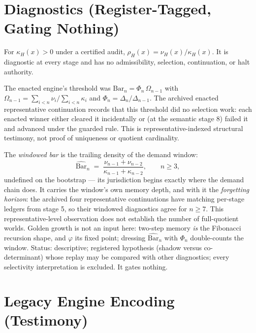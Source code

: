 \section{Diagnostics (Register-Tagged, Gating Nothing)}
\label{def:diagnostics}

\begin{definition}
For \(\kappa_H(x)>0\) under a certified audit,
\(\rho_H(x)=\nu_H(x)/\kappa_H(x)\). It is diagnostic at every stage and has no
admissibility, selection, continuation, or halt authority.
\end{definition}

\begin{definition}
The enacted engine's threshold was
\(\mathrm{Bar}_n=\Phi_n\,\Omega_{n-1}\) with
\(\Omega_{n-1}=\sum_{i<n}\nu_i/\sum_{i<n}\kappa_i\) and
\(\Phi_n=\Delta_n/\Delta_{n-1}\). The archived enacted representative
continuation records that this threshold did no selection work: each enacted
winner either cleared it incidentally or (at the semantic stage 8) failed it
and advanced under the guarded rule. This is representative-indexed
structural testimony, not proof of uniqueness or quotient cardinality.
\end{definition}

\begin{definition}
\label{def:windowed-bar}
The \emph{windowed bar} is the trailing density of the demand window:
\[
\widehat{\mathrm{Bar}}_n \;=\;
\frac{\nu_{n-1}+\nu_{n-2}}{\kappa_{n-1}+\kappa_{n-2}},
\qquad n\ge 3,
\]
undefined on the bootstrap --- its jurisdiction begins exactly where the
demand chain does. It carries the window's own memory depth, and with it the
\emph{forgetting horizon}: the archived four representative continuations
have matching per-stage ledgers from stage 5, so their windowed diagnostics
agree for \(n\ge 7\). This representative-level observation does not establish
the number of full-quotient worlds. Golden
growth is not an input here: two-step memory \emph{is} the Fibonacci
recursion shape, and \(\varphi\) its fixed point; dressing
\(\widehat{\mathrm{Bar}}_n\) with \(\Phi_n\) double-counts the window.
Status: descriptive; registered hypothesis (shadow versus co-determinant)
whose replay may be compared with other diagnostics; every selectivity
interpretation is excluded. It gates nothing.
\end{definition}

\section{Legacy Engine Encoding (Testimony)}

